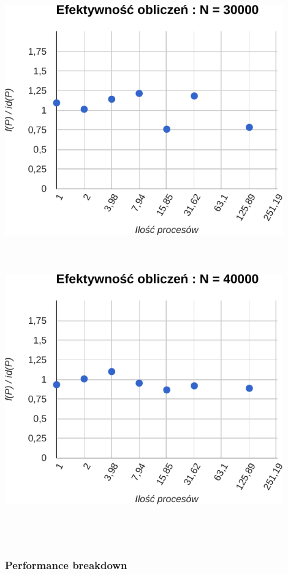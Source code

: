 \documentclass[paper=a4, fontsize=11pt]{scrartcl}	%
\numberwithin{equation}{section}		%
\numberwithin{figure}{section}			%
\numberwithin{table}{section}				%
\begin{document}
\includegraphics[width=120mm]{report/comp-eff-30000.pdf} \\ \ \\ \ \\ \ \\

\includegraphics[width=120mm]{report/comp-eff-40000.pdf} \\ \ \\ \ \\ \ \\


\subsubsection{Performance breakdown}
\end{document}
